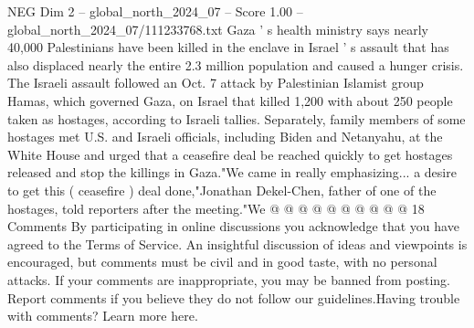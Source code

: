 \begin{textsample}{NEG Dim 2 – global\_north\_2024\_07 – Score 1.00 – global\_north\_2024\_07/111233768.txt}
Gaza ' s health ministry says nearly 40,000 Palestinians have been killed in the enclave in Israel ' s assault that has also displaced nearly the entire 2.3 million population and caused a hunger crisis.
The Israeli assault followed an Oct. 7 attack by Palestinian Islamist group Hamas, which governed Gaza, on Israel that killed 1,200 with about 250 people taken as hostages, according to Israeli tallies.
Separately, family members of some hostages met U.S. and Israeli officials, including Biden and Netanyahu, at the White House and urged that a ceasefire deal be reached quickly to get hostages released and stop the killings in Gaza."We came in really emphasizing... a desire to get this ( ceasefire ) deal done,"Jonathan Dekel-Chen, father of one of the hostages, told reporters after the meeting."We @ @ @ @ @ @ @ @ @ @ 18 Comments By participating in online discussions you acknowledge that you have agreed to the Terms of Service.
An insightful discussion of ideas and viewpoints is encouraged, but comments must be civil and in good taste, with no personal attacks.
If your comments are inappropriate, you may be banned from posting.
Report comments if you believe they do not follow our guidelines.Having trouble with comments?
Learn more here.

\end{textsample}
